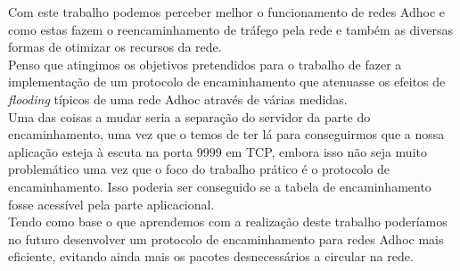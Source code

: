 \documentclass{llncs}
\begin{document}
Com este trabalho podemos perceber melhor o funcionamento de redes Adhoc e como estas fazem o reencaminhamento de tráfego pela rede e também as diversas formas de otimizar os recursos da rede.\\
Penso que atingimos os objetivos pretendidos para o trabalho de fazer a implementação de um protocolo de encaminhamento que atenuasse os efeitos de \emph{flooding} típicos de uma rede Adhoc através de várias medidas.\\
Uma das coisas a mudar seria a separação do servidor da parte do encaminhamento, uma vez que o temos de ter lá para conseguirmos que a nossa aplicação esteja à escuta na porta 9999 em TCP, embora isso não seja muito problemático uma vez que o foco do trabalho prático é o protocolo de encaminhamento. Isso poderia ser conseguido se a tabela de encaminhamento fosse acessível pela parte aplicacional.\\

Tendo como base o que aprendemos com a realização deste trabalho poderíamos no futuro desenvolver um protocolo de encaminhamento para redes Adhoc mais eficiente, evitando ainda mais os pacotes desnecessários a circular na rede.


\clearpage
\end{document}
